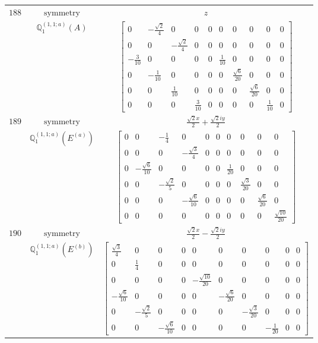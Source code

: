 \documentclass[fleqn,8pt,landscape]{jsarticle}
\begin{document}
\begin{longtable}{ccc}
$ 188 $ & $ \text{symmetry} $ & $ z $ \\
$  $ & $ \mathbb{Q}_{1}^{(1,1;a)}(A) $ & $ \begin{bmatrix} 0 & - \frac{\sqrt{2}}{4} & 0 & 0 & 0 & 0 & 0 & 0 & 0 & 0 \\ 0 & 0 & - \frac{\sqrt{2}}{4} & 0 & 0 & 0 & 0 & 0 & 0 & 0 \\ - \frac{3}{10} & 0 & 0 & 0 & 0 & \frac{1}{10} & 0 & 0 & 0 & 0 \\ 0 & - \frac{1}{10} & 0 & 0 & 0 & 0 & \frac{\sqrt{6}}{20} & 0 & 0 & 0 \\ 0 & 0 & \frac{1}{10} & 0 & 0 & 0 & 0 & \frac{\sqrt{6}}{20} & 0 & 0 \\ 0 & 0 & 0 & \frac{3}{10} & 0 & 0 & 0 & 0 & \frac{1}{10} & 0 \end{bmatrix} $ \\ \hline
$ 189 $ & $ \text{symmetry} $ & $ \frac{\sqrt{2} x}{2} + \frac{\sqrt{2} i y}{2} $ \\
$  $ & $ \mathbb{Q}_{1}^{(1,1;a)}(E^{(a)}) $ & $ \begin{bmatrix} 0 & 0 & - \frac{1}{4} & 0 & 0 & 0 & 0 & 0 & 0 & 0 \\ 0 & 0 & 0 & - \frac{\sqrt{3}}{4} & 0 & 0 & 0 & 0 & 0 & 0 \\ 0 & - \frac{\sqrt{6}}{10} & 0 & 0 & 0 & 0 & \frac{1}{20} & 0 & 0 & 0 \\ 0 & 0 & - \frac{\sqrt{2}}{5} & 0 & 0 & 0 & 0 & \frac{\sqrt{3}}{20} & 0 & 0 \\ 0 & 0 & 0 & - \frac{\sqrt{6}}{10} & 0 & 0 & 0 & 0 & \frac{\sqrt{6}}{20} & 0 \\ 0 & 0 & 0 & 0 & 0 & 0 & 0 & 0 & 0 & \frac{\sqrt{10}}{20} \end{bmatrix} $ \\ \hline
$ 190 $ & $ \text{symmetry} $ & $ \frac{\sqrt{2} x}{2} - \frac{\sqrt{2} i y}{2} $ \\
$  $ & $ \mathbb{Q}_{1}^{(1,1;a)}(E^{(b)}) $ & $ \begin{bmatrix} \frac{\sqrt{3}}{4} & 0 & 0 & 0 & 0 & 0 & 0 & 0 & 0 & 0 \\ 0 & \frac{1}{4} & 0 & 0 & 0 & 0 & 0 & 0 & 0 & 0 \\ 0 & 0 & 0 & 0 & - \frac{\sqrt{10}}{20} & 0 & 0 & 0 & 0 & 0 \\ - \frac{\sqrt{6}}{10} & 0 & 0 & 0 & 0 & - \frac{\sqrt{6}}{20} & 0 & 0 & 0 & 0 \\ 0 & - \frac{\sqrt{2}}{5} & 0 & 0 & 0 & 0 & - \frac{\sqrt{3}}{20} & 0 & 0 & 0 \\ 0 & 0 & - \frac{\sqrt{6}}{10} & 0 & 0 & 0 & 0 & - \frac{1}{20} & 0 & 0 \end{bmatrix} $ \\ \hline

\end{longtable}
\end{document}
